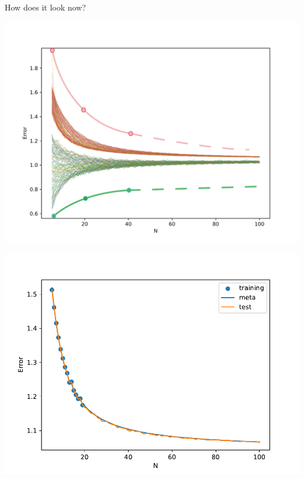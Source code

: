 \documentclass[aspectratio=169]{beamer}
\begin{document}
\begin{frame}{How does it look now?}
  \begin{minipage}{0.5\textwidth}
    \includegraphics[width=\textwidth]{figures/lc.pdf}
  \end{minipage}%
  \begin{minipage}{0.5\textwidth}
    \includegraphics[width=\textwidth]{figures/lr_2_pca.pdf}
  \end{minipage}

\end{frame}
\end{document}
